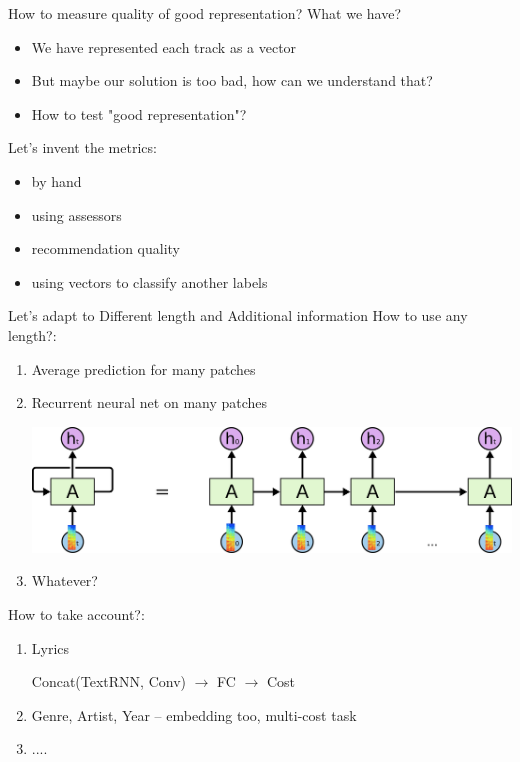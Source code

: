 \documentclass{beamer}
\begin{document}
\begin{frame}{How to measure quality of good representation?} 
	What we have?
	\begin{itemize}
		\item We have represented each track as a vector
		\item But maybe our solution is too bad, how can we understand that?
		\item How to test "good representation"?
	\end{itemize}
	
	Let's invent the metrics:
		\begin{itemize}
			\item by hand
			\item using assessors
			\item recommendation quality 
			\item using vectors to classify another labels
		\end{itemize}
\end{frame}

\begin{frame}{Let's adapt to Different length and Additional information} 
	How to use any length?:
		\begin{enumerate}
			\item Average prediction for many patches 		
			\item Recurrent neural net on many patches
				\begin{center}				
					\includegraphics[scale=0.25]{img/rnn}
				\end{center} 
			\item Whatever?
		\end{enumerate}
	How to take account?:
		\begin{enumerate}
			\item Lyrics
				\begin{center}
					Concat(TextRNN, Conv) $\rightarrow$ FC $\rightarrow$ Cost
				\end{center}
			\item Genre, Artist, Year -- embedding too, multi-cost task
			\item ....
		\end{enumerate}
\end{frame}
\end{document}
